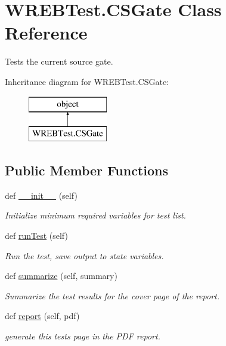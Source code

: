 \hypertarget{class_w_r_e_b_test_1_1_c_s_gate}{}\section{W\+R\+E\+B\+Test.\+C\+S\+Gate Class Reference}
\label{class_w_r_e_b_test_1_1_c_s_gate}


Tests the current source gate.  


Inheritance diagram for W\+R\+E\+B\+Test.\+C\+S\+Gate\+:\begin{figure}[H]
\begin{center}
\leavevmode
\includegraphics[height=2.000000cm]{class_w_r_e_b_test_1_1_c_s_gate}
\end{center}
\end{figure}
\subsection*{Public Member Functions}
\begin{DoxyCompactItemize}
\item 
def \hyperlink{class_w_r_e_b_test_1_1_c_s_gate_a1ef42c27062a4336a6e38153f0d63f22}{\+\_\+\+\_\+init\+\_\+\+\_\+} (self)
\begin{DoxyCompactList}\small\item\em Initialize minimum required variables for test list. \end{DoxyCompactList}\item 
def \hyperlink{class_w_r_e_b_test_1_1_c_s_gate_a2022ca5cfd0cca5dc1e68c96bee503e5}{run\+Test} (self)
\begin{DoxyCompactList}\small\item\em Run the test, save output to state variables. \end{DoxyCompactList}\item 
def \hyperlink{class_w_r_e_b_test_1_1_c_s_gate_ace80c551527bc66602b517fa0891ae55}{summarize} (self, summary)
\begin{DoxyCompactList}\small\item\em Summarize the test results for the cover page of the report. \end{DoxyCompactList}\item 
def \hyperlink{class_w_r_e_b_test_1_1_c_s_gate_a9f773280dd583a852b784ea858f52d5c}{report} (self, pdf)
\begin{DoxyCompactList}\small\item\em generate this test\textquotesingle{}s page in the P\+DF report. \end{DoxyCompactList}\end{DoxyCompactItemize}


